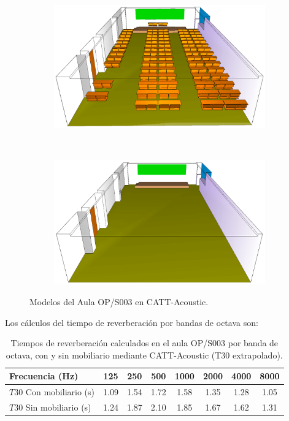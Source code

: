 \begin{figure}[H]
    \centering
    \begin{subfigure}[b]{0.45\textwidth}
    	\centering
        \includegraphics[width=0.9\linewidth]{archivos/capturas/opticallenacatt.png}
    \end{subfigure}
    ~ %
    \begin{subfigure}[b]{0.45\textwidth}
    	\centering
        \includegraphics[width=0.9\linewidth]{archivos/capturas/opticavaciacatt.png}
    \end{subfigure}
    \caption{Modelos del Aula OP/S003 en CATT-Acoustic.}\label{modeloopcatt}
\end{figure}

\newpage

Los cálculos del tiempo de reverberación por bandas de octava son:

\begin{table}[H]
\centering
{
\begin{tabular}{@{}lccccccc@{}}
\toprule
Frecuencia (Hz) & 125 & 250 & 500 & 1000 & 2000 & 4000 & 8000 \\ \midrule
$T30$ Con mobiliario (s) & 1.09 & 1.54 & 1.72 & 1.58 & 1.35 & 1.28 & 1.05 \\
$T30$ Sin mobiliario (s) & 1.24 & 1.87 & 2.10 & 1.85 & 1.67 & 1.62 & 1.31 \\ \bottomrule
\end{tabular}
}
\caption{Tiempos de reverberación calculados en el aula OP/S003 por banda de octava, con y sin mobiliario mediante CATT-Acoustic (T30 extrapolado).}
\label{tab:revopcatt}
\end{table}


